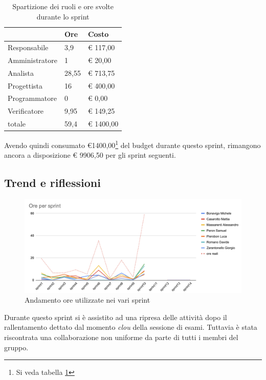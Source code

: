 \begin{table}[ht]
    \begin{tabularx}{\linewidth}{X|l|l}
    \rowcolor{gray!30}& Ore & Costo \\
    \hline
    
    Responsabile & 3,9 & € 117,00 \\
    \rowcolor{gray!10}Amministratore & 1 & € 20,00 \\
    Analista & 28,55 & € 713,75 \\
    \rowcolor{gray!10}Progettista & 16 & € 400,00 \\
    Programmatore & 0 & € 0,00 \\
    \rowcolor{gray!10}Verificatore & 9,95 &€ 149,25 \\
    totale & 59,4 & € 1400,00 \\
    \end{tabularx}
    \caption{\label{costi-ruolo}Spartizione dei ruoli e ore svolte durante lo sprint}
\end{table}

Avendo quindi consumato €1400,00\footnote{Si veda tabella \ref{costi-ruolo}} del budget durante questo sprint, rimangono ancora a disposizione € 9906,50 per gli sprint seguenti.

\subsection{Trend e riflessioni}\label{subsec:trend}

\begin{figure}[H]
    \includegraphics[width=\linewidth]{img/andamento.png}
    \caption{Andamento ore utilizzate nei vari sprint}\label{img:andamento}
\end{figure}

Durante questo sprint si è assistito ad una ripresa delle attività dopo il rallentamento dettato dal momento {\it{clou}} della sessione di esami. Tuttavia è stata riscontrata una collaborazione non uniforme da parte di tutti i membri del gruppo.

